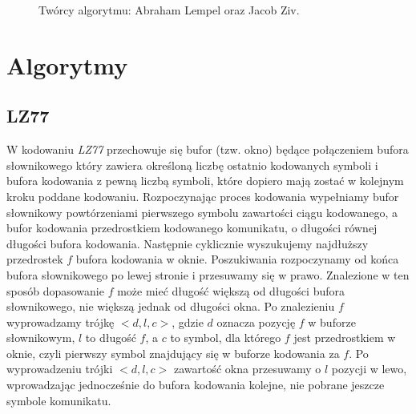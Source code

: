 \documentclass{article}
\begin{document}
\begin{figure}[h!]
\caption{Twórcy algorytmu: Abraham Lempel oraz Jacob Ziv.}
\label{fig:mobile_test_code_view}
\end{figure}

\section{Algorytmy}
\subsection{LZ77}
W kodowaniu \textit{LZ77} przechowuje się bufor (tzw. okno) będące połączeniem bufora słownikowego który zawiera określoną liczbę ostatnio kodowanych symboli i bufora kodowania z pewną liczbą symboli, które dopiero mają zostać w kolejnym kroku poddane kodowaniu. Rozpoczynając proces kodowania wypełniamy bufor słownikowy powtórzeniami pierwszego symbolu zawartości ciągu kodowanego, a bufor kodowania przedrostkiem kodowanego komunikatu, o długości równej długości bufora kodowania. Następnie cyklicznie wyszukujemy najdłuższy przedrostek $f$ bufora  kodowania  w  oknie.  Poszukiwania rozpoczynamy od końca bufora słownikowego po lewej stronie i przesuwamy się w prawo. Znalezione w ten sposób  dopasowanie $f$ może mieć długość większą od długości bufora słownikowego, nie większą jednak od długości okna. Po znalezieniu $f$ wyprowadzamy trójkę $<d, l, c>$, gdzie $d$ oznacza pozycję $f$ w buforze słownikowym, $l$ to długość $f$, a $c$ to symbol, dla którego $f$ jest przedrostkiem  w  oknie, czyli pierwszy symbol znajdujący się w buforze kodowania za $f$. Po  wyprowadzeniu  trójki  $<d, l, c>$  zawartość  okna  przesuwamy  o  $l$  pozycji  w  lewo,  wprowadzając  jednocześnie  do  bufora  kodowania  kolejne,  nie  pobrane  jeszcze  symbole  komunikatu.
\end{document}
